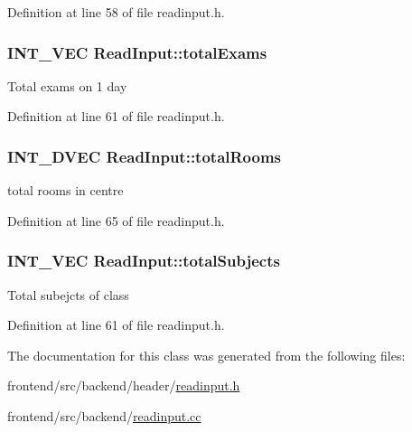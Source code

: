 \-Definition at line 58 of file readinput.\-h.

\hypertarget{classReadInput_aa5fd69afc1c76686f37bcb20805ba551}{
\subsubsection[{total\-Exams}]{\setlength{\rightskip}{0pt plus 5cm}\-I\-N\-T\-\_\-\-V\-E\-C {\bf \-Read\-Input\-::total\-Exams}}}\label{de/d50/classReadInput_aa5fd69afc1c76686f37bcb20805ba551}
\-Total exams on 1 day 

\-Definition at line 61 of file readinput.\-h.

\hypertarget{classReadInput_a21ae2519b9f3dc9ae938fc670995822f}{
\subsubsection[{total\-Rooms}]{\setlength{\rightskip}{0pt plus 5cm}\-I\-N\-T\-\_\-D\-V\-E\-C {\bf \-Read\-Input\-::total\-Rooms}}}\label{de/d50/classReadInput_a21ae2519b9f3dc9ae938fc670995822f}
total rooms in centre 

\-Definition at line 65 of file readinput.\-h.

\hypertarget{classReadInput_ad615390a3c9548b63e6081459801d3b3}{
\subsubsection[{total\-Subjects}]{\setlength{\rightskip}{0pt plus 5cm}\-I\-N\-T\-\_\-\-V\-E\-C {\bf \-Read\-Input\-::total\-Subjects}}}\label{de/d50/classReadInput_ad615390a3c9548b63e6081459801d3b3}
\-Total subejcts of class 

\-Definition at line 61 of file readinput.\-h.



\-The documentation for this class was generated from the following files\-:\begin{DoxyCompactItemize}
\item 
frontend/src/backend/header/\hyperlink{readinput_8h}{readinput.\-h}\item 
frontend/src/backend/\hyperlink{readinput_8cc}{readinput.\-cc}\end{DoxyCompactItemize}
